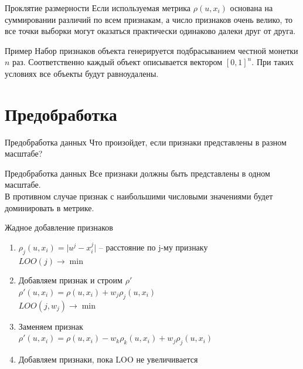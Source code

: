 \documentclass[10pt]{beamer}
\begin{document}
\begin{frame}{Проклятие размерности}
	\centering
	Если используемая метрика ${\rho(u, x_i)}$ основана на суммировании различий по всем признакам, а число признаков очень велико,
	то все точки выборки могут оказаться практически одинаково далеки друг от друга.\\
\end{frame}

\begin{frame}{Пример}
	\centering
	Набор признаков объекта генерируется подбрасыванием честной монетки $n$ раз. Соответственно
	каждый объект описывается вектором $[0, 1]^n$. При таких условиях все объекты будут равноудалены.
\end{frame}

\section{Предобработка}

\begin{frame}{Предобработка данных}
	\centering
	Что произойдет, если признаки представлены в разном масштабе?
\end{frame}

\begin{frame}{Предобработка данных}
	Все признаки должны быть представлены \alert{в одном масштабе}. \\
	В противном случае признак с наибольшими числовыми значениями будет доминировать в метрике.
\end{frame}

\begin{frame}{Жадное добавление признаков}
	\begin{enumerate} [<+->]
		\item ${\rho_j(u, x_i) = \vert u^j - x_i^j \vert}$ -- расстояние по j-му признаку\\
		          $LOO(j) \rightarrow \min$\\
		\item Добавляем признак и строим $\rho'$\\
							${\rho'(u, x_i) = \rho(u, x_i) + w_j\rho_j(u, x_i)}$\\
							$LOO(j, w_j) \rightarrow \min$\\
		\item Заменяем признак\\
            		${\rho'(u, x_i) = \rho(u, x_i) - w_k\rho_k(u, x_i) + w_j\rho_j(u, x_i)}$\\
		\item Добавляем признаки, пока LOO не увеличивается
	\end{enumerate}
\end{frame}
\end{document}

